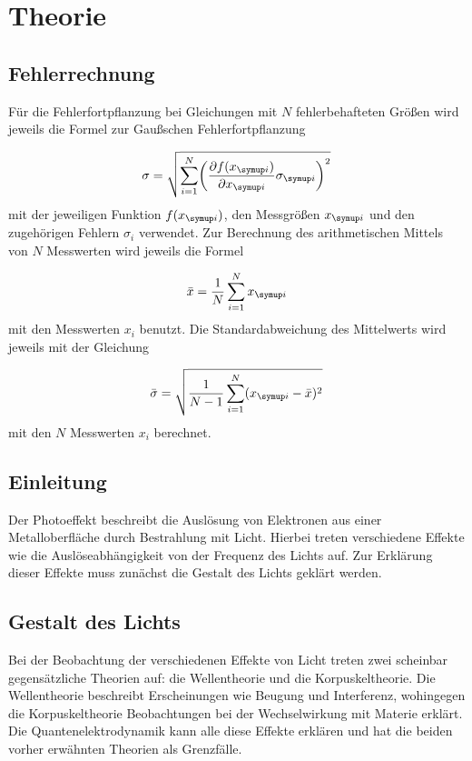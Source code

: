 \section{Theorie}
\label{sec:Theorie}

\subsection{Fehlerrechnung}

Für die Fehlerfortpflanzung bei Gleichungen mit $N$ fehlerbehafteten Größen
wird jeweils die Formel zur Gaußschen Fehlerfortpflanzung

\begin{equation*}
  \sigma = \sqrt{\sum_{i=1}^{N}\biggl(\frac{\partial f(x_{\g{i}})}{\partial x_{\g{i}}}
  \sigma_{\g{i}}\biggr)^2}
\end{equation*}
mit der jeweiligen Funktion $f(x_{\g{i}})$, den Messgrößen $x_{\g{i}}$ und den
zugehörigen Fehlern $\sigma_i$ verwendet.
Zur Berechnung des arithmetischen Mittels von $N$ Messwerten wird jeweils die
Formel

\begin{equation*}
  \bar{x} = \frac{1}{N}\sum_{i=1}^{N}x_{\g{i}}
\end{equation*}
mit den Messwerten $x_i$ benutzt.
Die Standardabweichung des Mittelwerts wird jeweils mit der Gleichung

\begin{equation*}
  \bar{\sigma} = \sqrt{\frac{1}{N-1}\sum_{i=1}^{N}(x_{\g{i}} - \bar{x})^2}
\end{equation*}
mit den $N$ Messwerten $x_i$ berechnet.

\subsection{Einleitung}

Der Photoeffekt beschreibt die Auslösung von Elektronen aus einer
Metalloberfläche durch Bestrahlung mit Licht. Hierbei treten verschiedene Effekte wie
die Auslöseabhängigkeit von der Frequenz des Lichts auf. Zur Erklärung dieser Effekte muss zunächst
die Gestalt des Lichts geklärt werden.

\subsection{Gestalt des Lichts}

Bei der Beobachtung der verschiedenen Effekte von Licht
treten zwei scheinbar gegensätzliche Theorien auf: die Wellentheorie und die
Korpuskeltheorie. Die Wellentheorie beschreibt Erscheinungen wie Beugung und Interferenz,
wohingegen die Korpuskeltheorie Beobachtungen bei der Wechselwirkung
mit Materie erklärt.
Die Quantenelektrodynamik kann alle diese Effekte erklären und hat die beiden
vorher erwähnten Theorien als Grenzfälle.

